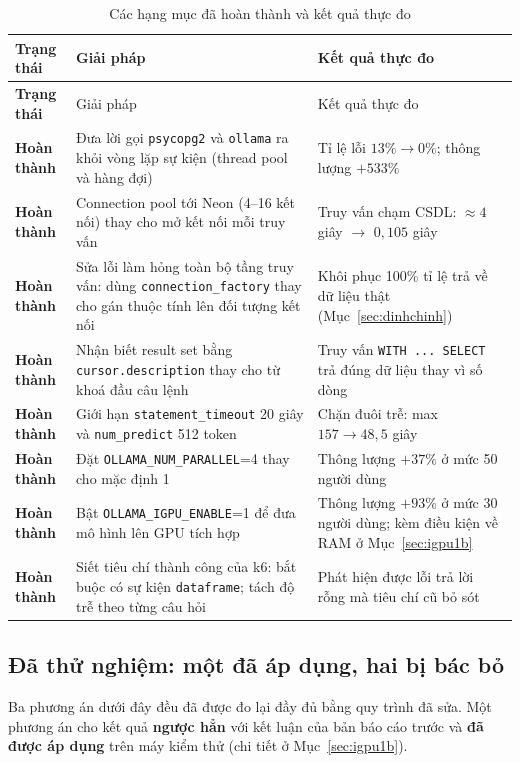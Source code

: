 \documentclass[12pt,a4paper]{article}
\begin{document}
\begin{longtable}{>{\bfseries}p{2.2cm}p{8.3cm}p{3.6cm}}
\caption{Các hạng mục đã hoàn thành và kết quả thực đo}\\
\toprule
Trạng thái & Giải pháp & Kết quả thực đo\\
\midrule
\endfirsthead
\toprule
Trạng thái & Giải pháp & Kết quả thực đo\\
\midrule
\endhead
\textcolor{successgreen}{Hoàn thành} & Đưa lời gọi \texttt{psycopg2} và \texttt{ollama} ra khỏi vòng lặp sự kiện (thread pool và hàng đợi) &
Tỉ lệ lỗi $13\% \to 0\%$; thông lượng $+533\%$\\
\textcolor{successgreen}{Hoàn thành} & Connection pool tới Neon (4--16 kết nối) thay cho mở kết nối mỗi truy vấn &
Truy vấn chạm CSDL: $\approx 4$ giây $\to$ $0{,}105$ giây\\
\textcolor{successgreen}{Hoàn thành} & Sửa lỗi làm hỏng toàn bộ tầng truy vấn: dùng \texttt{connection\_factory} thay cho gán thuộc tính lên đối tượng kết nối &
Khôi phục 100\% tỉ lệ trả về dữ liệu thật (Mục~\ref{sec:dinhchinh})\\
\textcolor{successgreen}{Hoàn thành} & Nhận biết result set bằng \texttt{cursor.description} thay cho từ khoá đầu câu lệnh &
Truy vấn \texttt{WITH ... SELECT} trả đúng dữ liệu thay vì số dòng\\
\textcolor{successgreen}{Hoàn thành} & Giới hạn \texttt{statement\_timeout} 20 giây và \texttt{num\_predict} 512 token &
Chặn đuôi trễ: max $157 \to 48{,}5$ giây\\
\textcolor{successgreen}{Hoàn thành} & Đặt \texttt{OLLAMA\_NUM\_PARALLEL}=4 thay cho mặc định 1 &
Thông lượng $+37\%$ ở mức 50 người dùng\\
\textcolor{successgreen}{Hoàn thành} & Bật \texttt{OLLAMA\_IGPU\_ENABLE}=1 để đưa mô hình lên GPU tích hợp &
Thông lượng $+93\%$ ở mức 30 người dùng; kèm điều kiện về RAM ở Mục~\ref{sec:igpu1b}\\
\textcolor{successgreen}{Hoàn thành} & Siết tiêu chí thành công của k6: bắt buộc có sự kiện \texttt{dataframe}; tách độ trễ theo từng câu hỏi &
Phát hiện được lỗi trả lời rỗng mà tiêu chí cũ bỏ sót\\
\bottomrule
\end{longtable}

\subsection{Đã thử nghiệm: một đã áp dụng, hai bị bác bỏ}

Ba phương án dưới đây đều đã được đo lại đầy đủ bằng quy trình đã sửa. Một phương
án cho kết quả \textbf{ngược hẳn} với kết luận của bản báo cáo trước và
\textbf{đã được áp dụng} trên máy kiểm thử (chi tiết ở Mục~\ref{sec:igpu1b}).
\end{document}
